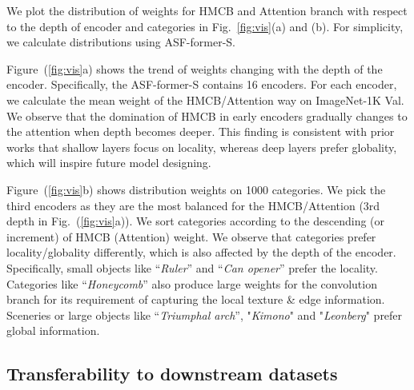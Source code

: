 \documentclass[lettersize,journal]{IEEEtran}
\begin{document}
We plot the distribution of weights for HMCB and Attention branch with respect to the depth of encoder and categories in Fig.~\ref{fig:vis}(a) and (b). For simplicity, we calculate distributions using ASF-former-S.

Figure~(\ref{fig:vis}a) shows the trend of weights changing with the depth of the encoder. Specifically, the ASF-former-S contains 16 encoders. For each encoder, we calculate the mean weight of the HMCB/Attention way on ImageNet-1K Val. We observe that the domination of HMCB in early encoders gradually changes to the attention when depth becomes deeper. This finding is consistent with prior works \cite{Pan2021OnTI} that shallow layers focus on locality, whereas deep layers prefer globality, which will inspire future model designing.

Figure~(\ref{fig:vis}b) shows distribution weights on 1000 categories. We pick the third encoders as they are the most balanced for the HMCB/Attention (3rd depth in Fig.~(\ref{fig:vis}a)). We sort categories according to the descending (or increment) of HMCB (Attention) weight. We observe that categories prefer locality/globality differently, which is also affected by the depth of the encoder.
Specifically, small objects like “\textit{Ruler}” and “\textit{Can opener}” prefer the locality. Categories like “\textit{Honeycomb}” also produce large weights for the convolution branch for its requirement of capturing the local texture \& edge information. Sceneries or large objects like “\textit{Triumphal arch}”, "\textit{Kimono}" and "\textit{Leonberg}" prefer global information.

\subsection{Transferability to downstream datasets}
\end{document}
